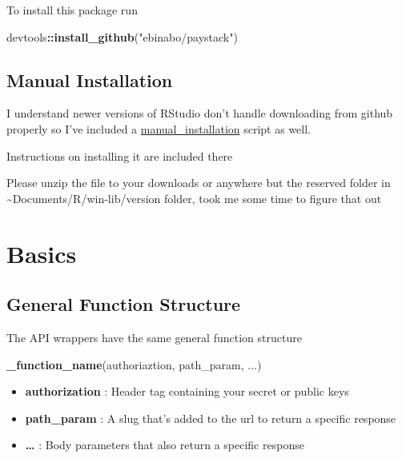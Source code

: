 \documentclass[]{book}
\newenvironment{Shaded}{\begin{snugshade}}{\end{snugshade}}
\newcommand{\KeywordTok}[1]{\textcolor[rgb]{0.13,0.29,0.53}{\textbf{#1}}}
\newcommand{\StringTok}[1]{\textcolor[rgb]{0.31,0.60,0.02}{#1}}
\newcommand{\OperatorTok}[1]{\textcolor[rgb]{0.81,0.36,0.00}{\textbf{#1}}}
\newcommand{\NormalTok}[1]{#1}
\providecommand{\tightlist}{%
  \setlength{\itemsep}{0pt}\setlength{\parskip}{0pt}}
\begin{document}
To install this package run

\begin{Shaded}
\begin{Highlighting}[]
\NormalTok{devtools}\OperatorTok{::}\KeywordTok{install_github}\NormalTok{(}\StringTok{"ebinabo/paystack"}\NormalTok{)}
\end{Highlighting}
\end{Shaded}

\section{Manual Installation}\label{manual-installation}

I understand newer versions of RStudio don't handle downloading from
github properly so I've included a
\href{https://github.com/ebinabo/paystack/blob/master/manual_installation.R}{manual\_installation}
script as well.

Instructions on installing it are included there

Please unzip the file to your downloads or anywhere but the reserved
folder in \textasciitilde{}Documents/R/win-lib/version folder, took me
some time to figure that out

\chapter{Basics}\label{basics}

\section{General Function Structure}\label{general-function-structure}

The API wrappers have the same general function structure

\begin{Shaded}
\begin{Highlighting}[]
\KeywordTok{_function_name}\NormalTok{(authoriaztion, path_param, ...)}
\end{Highlighting}
\end{Shaded}

\begin{itemize}
\tightlist
\item
  \textbf{authorization} : Header tag containing your secret or public
  keys
\item
  \textbf{path\_param} : A slug that's added to the url to return a
  specific response
\item
  \textbf{\ldots{}} : Body parameters that also return a specific
  response
\end{itemize}
\end{document}
